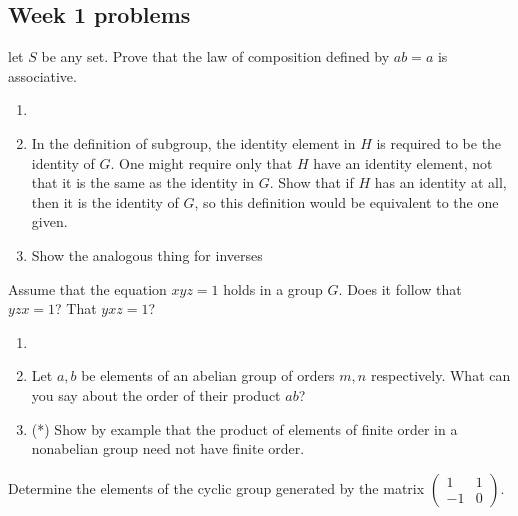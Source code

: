 \subsection{Week 1 problems}

\begin{boxedProblem}[2.1.7]
let $S$ be any set. Prove that the law of composition defined by $ab = a$ is associative.
\end{boxedProblem}

\begin{boxedProblem}[2.2.15]
    \begin{enumerate}
        \item[]
        \item
    In the definition of subgroup, the identity element in $H$ is required to be the identity of $G$. One might require only that $H$ have an identity element, not that it is the same as the identity in $G$. Show that if $H$ has an identity at all, then it is the identity of $G$, so this definition would be equivalent to the one given.
    \item Show the analogous thing for inverses
    \end{enumerate}

\end{boxedProblem}


\begin{boxedProblem}[2.1.5]
    Assume that the equation $xyz = 1$ holds in a group $G$. Does it follow that $yzx = 1$? That $yxz = 1$?
\end{boxedProblem}

\begin{boxedProblem}[2.2.20]
    \begin{enumerate}
        \item[]
    \item Let $a, b$ be elements of an abelian group of orders $m, n$ respectively. What can you say about the order of their product $ab$?
    \item (*) Show by example that the product of elements of finite order in a nonabelian group need not have finite order.
    \end{enumerate}
\end{boxedProblem}

\begin{boxedProblem}[2.2.1]
    Determine the elements of the cyclic group generated by the matrix $\begin{pmatrix} 1 & 1 \\ -1 & 0 \end{pmatrix}$.
\end{boxedProblem}

